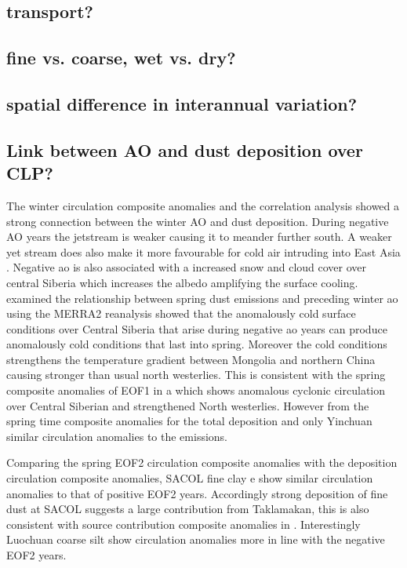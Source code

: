 \subsection{transport?}
\subsection{fine vs. coarse, wet vs. dry?}
\subsection{spatial difference in interannual variation?}
\subsection{Link between AO and dust deposition over CLP?}
The winter circulation composite anomalies and the correlation analysis showed a strong connection between the winter AO and dust deposition. During negative AO years the jetstream is weaker causing it to meander further south. A weaker yet stream does also make it more favourable for cold air intruding into East Asia \parencite{he2017impact}. Negative \acrshort{ao} is also associated with a increased snow and cloud cover over central Siberia which increases the albedo amplifying the surface cooling.  \textcite{liu2018influence} examined the relationship between spring dust emissions and preceding winter \acrshort{ao} using the MERRA2 reanalysis showed that the anomalously cold surface conditions over Central Siberia that arise during negative \acrshort{ao} years can produce anomalously cold conditions that last into spring. Moreover the cold conditions strengthens the temperature gradient between Mongolia and northern China causing stronger than usual north westerlies. This is consistent with the spring composite anomalies of EOF1 in a which shows anomalous cyclonic circulation over Central Siberian and strengthened North westerlies. However from the spring time composite anomalies for the total deposition   and  only Yinchuan similar circulation anomalies to the emissions. 

Comparing the spring EOF2 circulation composite anomalies with the deposition circulation composite anomalies, SACOL fine clay e show similar circulation anomalies to that of positive EOF2 years. Accordingly strong deposition of fine dust at SACOL suggests a large contribution from Taklamakan, this is also consistent with source contribution composite anomalies in . Interestingly Luochuan coarse silt show circulation anomalies more in line with the negative EOF2 years.    

